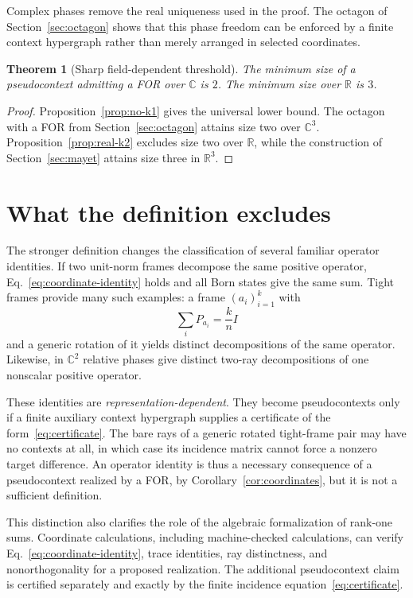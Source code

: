 \documentclass[
  twocolumn,
  aps,
  pra,
  floatfix,
  amsmath,amssymb,
  longbibliography
]{revtex4-2}
\newtheorem{theorem}{Theorem}
\theoremstyle{definition}
\theoremstyle{remark}
\newcommand{\R}{\mathbb R}
\newcommand{\C}{\mathbb C}
\begin{document}
Complex phases remove the real uniqueness used in the proof.  The octagon of
Section~\ref{sec:octagon} shows that this phase freedom can be enforced by a
finite context hypergraph rather than merely arranged in selected
coordinates.

\begin{theorem}[Sharp field-dependent threshold]
\label{thm:threshold}
The minimum size of a pseudocontext admitting a FOR over $\C$ is
$2$.  The minimum size over $\R$ is $3$.
\end{theorem}

\begin{proof}
Proposition~\ref{prop:no-k1} gives the universal lower bound.  The octagon
with a FOR from Section~\ref{sec:octagon} attains size two over
$\C^3$.  Proposition~\ref{prop:real-k2} excludes size two over $\R$, while
the construction of Section~\ref{sec:mayet} attains size three in $\R^3$.
\end{proof}

\section{What the definition excludes}
\label{sec:excludes}

The stronger definition changes the classification of several familiar
operator identities.  If two unit-norm frames decompose the same positive
operator, Eq.~\eqref{eq:coordinate-identity} holds and all Born states give
the same sum.  Tight frames provide many such examples: a frame
$(a_i)_{i=1}^k$ with
\[
 \sum_i P_{a_i}=\frac{k}{n}I
\]
and a generic rotation of it yields distinct decompositions of the same
operator.  Likewise, in $\C^2$ relative phases give distinct two-ray
decompositions of one nonscalar positive operator.

These identities are \emph{representation-dependent}.  They
become pseudocontexts only if a finite auxiliary context hypergraph supplies
a certificate of the form~\eqref{eq:certificate}.  The bare rays of a generic
rotated tight-frame pair may have no contexts at all, in which case its
incidence matrix cannot force a nonzero target difference.  An operator
identity is thus a necessary consequence of a pseudocontext realized by a
FOR, by Corollary~\ref{cor:coordinates}, but it is not a sufficient
definition.

This distinction also clarifies the role of the algebraic formalization of
rank-one sums.  Coordinate calculations, including machine-checked
calculations, can verify Eq.~\eqref{eq:coordinate-identity}, trace identities,
ray distinctness, and nonorthogonality for a proposed realization.  The
additional pseudocontext claim is certified separately and exactly by the
finite incidence equation~\eqref{eq:certificate}.
\end{document}
